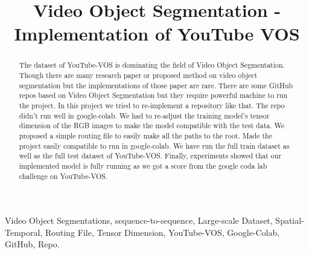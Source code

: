 \documentclass[conference]{IEEEtran}
\begin{document}
\title{Video Object Segmentation - Implementation of YouTube VOS\\
}

\author{
\and
{}
\and
{}
}

\maketitle

\begin{abstract}
The dataset of YouTube-VOS is dominating the field of Video Object Segmentation. Though there are many research paper or proposed method on video object segmentation but the implementations of those paper are rare. There are some GitHub repos based on Video Object Segmentation but they require powerful machine to run the project. In this project we tried to re-implement a repository like that. The repo didn’t run well in google-colab. We had to re-adjust the training model’s tensor dimension of the RGB images to make the model compatible with the test data. We proposed a simple routing file to easily make all the paths to the root. Made the project easily compatible to run in google-colab. We have run the full train dataset as well as the full test dataset of YouTube-VOS. Finally, experiments showed that our implemented model is fully running as we got a score from the google coda lab challenge on YouTube-VOS.
\end{abstract}

\begin{IEEEkeywords}
Video Object Segmentations, sequence-to-sequence, Large-scale Dataset, Spatial-Temporal, Routing File, Tensor Dimension, YouTube-VOS, Google-Colab, GitHub, Repo.
\end{IEEEkeywords}
\end{document}
